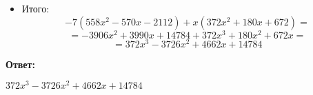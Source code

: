 \documentclass[a4paper,12pt]{article}
\begin{document}
\begin{itemize}
\[\begin{matrix}
1 & 4 & 0 & 1-x \\
0 & -30 & -16 & x-12 \\
0 & 0 & 6 & 1+2*x
\end{matrix}\right| = (-1)^{3} \left|\begin{matrix}
2 & x & x \\
-30 & -16 & x-12 \\
0 & 6 & 1+2*x
\end{matrix}\right| =
\]
\[
 = -1 \cdot (60x^2 - 226x + 112) = -60x^2 + 226x - 112
\]
Таким образом:
\[
x(12x+3536) -6(-60x^2+226x-112) = 12x^2 + 3536x +360x^2 + 672 = 372x^2 + 180x + 672
\]
\item Итого:
\[
-7(558x^2 -570x - 2112) + x(372x^2+180x+672) =
\]
\[
= -3906x^2+ 3990x + 14784 + 372x^3  + 180x^2 + 672x = 
\]
\[
= 372x^3 - 3726x^2 + 4662x + 14784
\]
\end{itemize}
\begin{center}
\textbf{Ответ:} 

$372x^3 - 3726x^2 + 4662x + 14784$
\end{center}
\newpage
\end{document}
